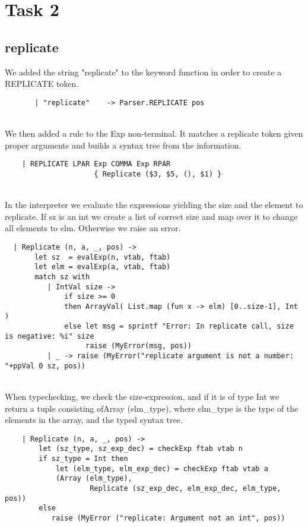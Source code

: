 \pagebreak
\section*{Task 2}

\subsection*{replicate}

We added the string "replicate" to the keyword function in order to create a REPLICATE token.
\begin{verbatim}
       | "replicate"    -> Parser.REPLICATE pos
\end{verbatim}
~\\

We then added a rule to the Exp non-terminal. It matches a replicate token given proper arguments and builds a syntax tree from the information.
\begin{verbatim}
    | REPLICATE LPAR Exp COMMA Exp RPAR
                     { Replicate ($3, $5, (), $1) } 
\end{verbatim}
~\\

In the interpreter we evaluate the expressions yielding the size and the element to replicate. If sz is an int we create a list of correct size and map over it to change all elements to elm. Otherwise we raise an error.
\begin{verbatim}
  | Replicate (n, a, _, pos) ->
       let sz  = evalExp(n, vtab, ftab)
       let elm = evalExp(a, vtab, ftab)
       match sz with
          | IntVal size ->
              if size >= 0
              then ArrayVal( List.map (fun x -> elm) [0..size-1], Int )
              else let msg = sprintf "Error: In replicate call, size is negative: %i" size
                   raise (MyError(msg, pos))
          | _ -> raise (MyError("replicate argument is not a number: "+ppVal 0 sz, pos))
\end{verbatim}
~\\

When typechecking, we check the size-expression, and if it is of type Int we return a tuple consisting ofArray (elm\_type), where elm\_type is the type of the elements in the array, and the typed syntax tree.
\begin{verbatim}
    | Replicate (n, a, _, pos) ->
        let (sz_type, sz_exp_dec) = checkExp ftab vtab n
        if sz_type = Int then
            let (elm_type, elm_exp_dec) = checkExp ftab vtab a
            (Array (elm_type), 
                    Replicate (sz_exp_dec, elm_exp_dec, elm_type, pos))
        else 
           raise (MyError ("replicate: Argument not an int", pos))
\end{verbatim}

